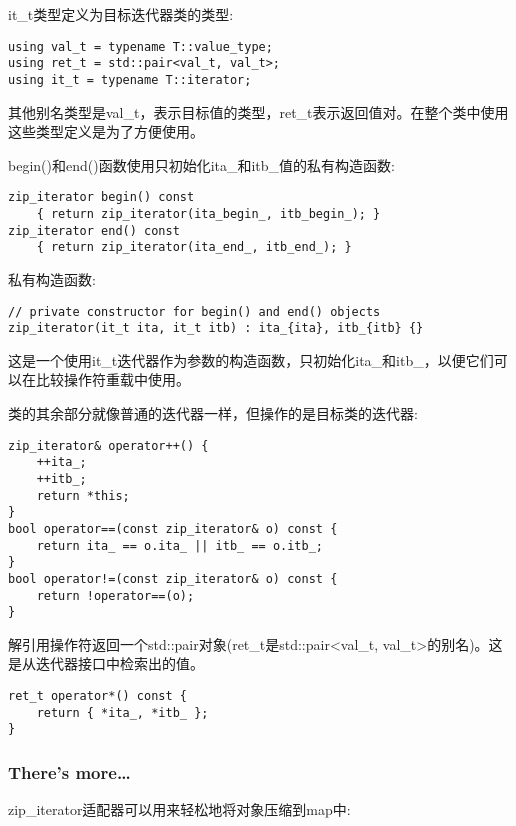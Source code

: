 it\_t类型定义为目标迭代器类的类型:

\begin{lstlisting}[style=styleCXX]
using val_t = typename T::value_type;
using ret_t = std::pair<val_t, val_t>;
using it_t = typename T::iterator;
\end{lstlisting}

其他别名类型是val\_t，表示目标值的类型，ret\_t表示返回值对。在整个类中使用这些类型定义是为了方便使用。

begin()和end()函数使用只初始化ita\_和itb\_值的私有构造函数:

\begin{lstlisting}[style=styleCXX]
zip_iterator begin() const
	{ return zip_iterator(ita_begin_, itb_begin_); }
zip_iterator end() const
	{ return zip_iterator(ita_end_, itb_end_); }
\end{lstlisting}

私有构造函数:

\begin{lstlisting}[style=styleCXX]
// private constructor for begin() and end() objects
zip_iterator(it_t ita, it_t itb) : ita_{ita}, itb_{itb} {}
\end{lstlisting}

这是一个使用it\_t迭代器作为参数的构造函数，只初始化ita\_和itb\_，以便它们可以在比较操作符重载中使用。

类的其余部分就像普通的迭代器一样，但操作的是目标类的迭代器:

\begin{lstlisting}[style=styleCXX]
zip_iterator& operator++() {
	++ita_;
	++itb_;
	return *this;
}
bool operator==(const zip_iterator& o) const {
	return ita_ == o.ita_ || itb_ == o.itb_;
}
bool operator!=(const zip_iterator& o) const {
	return !operator==(o);
}
\end{lstlisting}

解引用操作符返回一个std::pair对象(ret\_t是std::pair<val\_t, val\_t>的别名)。这是从迭代器接口中检索出的值。

\begin{lstlisting}[style=styleCXX]
ret_t operator*() const {
	return { *ita_, *itb_ };
}
\end{lstlisting}

\subsubsection{There's more…}

zip\_iterator适配器可以用来轻松地将对象压缩到map中:


